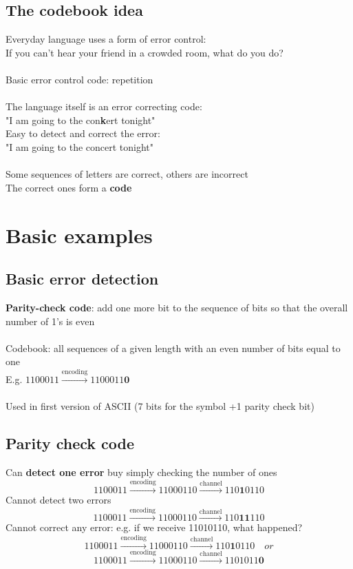 \documentclass{article}[18pt]
\begin{document}
\subsection{The codebook idea}
Everyday language uses a form of error control:\\
If you can't hear your friend in a crowded room, what do you do?\\
\\
Basic error control code: repetition\\
\\
The language itself is an error correcting code:\\
"I am going to the con\textbf{k}ert tonight"\\
Easy to detect and correct the error:\\
"I am going to the concert tonight"\\
\\
Some sequences of letters are correct, others are incorrect\\
The correct ones form a \textbf{code}
\section{Basic examples}
\subsection{Basic error detection}
\textbf{Parity-check code}: add one more bit to the sequence of bits so that the overall number of 1's is even\\
\\
Codebook: all sequences of a given length with an even number of bits equal to one\\
E.g. $1100011\xrightarrow{\text{encoding}}1100011\mathbf{0}$\\
\\
Used in first version of ASCII (7 bits for the symbol +1 parity check bit)
\subsection{Parity check code}
Can \textbf{detect one error} buy simply checking the number of ones
$$1100011\xrightarrow{\text{encoding}}11000110\xrightarrow{\text{channel}}110\textbf{1}0110$$
Cannot detect two errors
$$1100011\xrightarrow{\text{encoding}}11000110\xrightarrow{\text{channel}}110\textbf{11}110$$
Cannot correct any error: e.g. if we receive 11010110, what happened?
$$1100011\xrightarrow{\text{encoding}}11000110\xrightarrow{\text{channel}}110\textbf{1}0110 \quad or$$
$$1100011\xrightarrow{\text{encoding}}11000110\xrightarrow{\text{channel}}1101011\mathbf{0}$$
\end{document}
